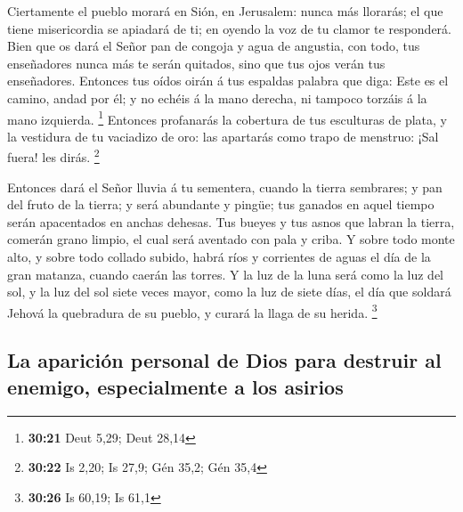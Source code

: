  Ciertamente el pueblo morará en Sión, en Jerusalem:
nunca más llorarás; el que tiene misericordia se apiadará de ti; en
oyendo la voz de tu clamor te responderá.  Bien que os
dará el Señor pan de congoja y agua de angustia, con todo, tus
enseñadores nunca más te serán quitados, sino que tus ojos verán tus
enseñadores.  Entonces tus oídos oirán á tus espaldas
palabra que diga: Este es el camino, andad por él; y no echéis á la mano
derecha, ni tampoco torzáis á la mano izquierda. \footnote{\textbf{30:21}
  Deut 5,29; Deut 28,14}  Entonces profanarás la
cobertura de tus esculturas de plata, y la vestidura de tu vaciadizo de
oro: las apartarás como trapo de menstruo: ¡Sal fuera! les dirás.
\footnote{\textbf{30:22} Is 2,20; Is 27,9; Gén 35,2; Gén 35,4}

 Entonces dará el Señor lluvia á tu sementera, cuando la
tierra sembrares; y pan del fruto de la tierra; y será abundante y
pingüe; tus ganados en aquel tiempo serán apacentados en anchas dehesas.
 Tus bueyes y tus asnos que labran la tierra, comerán
grano limpio, el cual será aventado con pala y criba.  Y
sobre todo monte alto, y sobre todo collado subido, habrá ríos y
corrientes de aguas el día de la gran matanza, cuando caerán las torres.
 Y la luz de la luna será como la luz del sol, y la luz
del sol siete veces mayor, como la luz de siete días, el día que soldará
Jehová la quebradura de su pueblo, y curará la llaga de su herida.
\footnote{\textbf{30:26} Is 60,19; Is 61,1}

\hypertarget{la-apariciuxf3n-personal-de-dios-para-destruir-al-enemigo-especialmente-a-los-asirios}{%
\subsection{La aparición personal de Dios para destruir al enemigo,
especialmente a los
asirios}\label{la-apariciuxf3n-personal-de-dios-para-destruir-al-enemigo-especialmente-a-los-asirios}}

